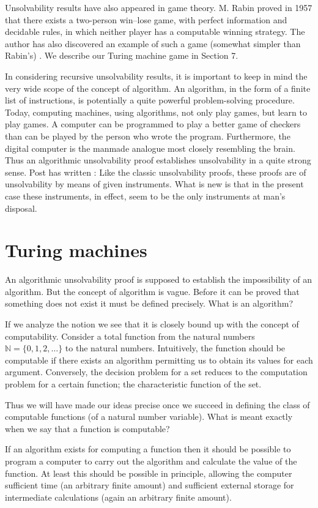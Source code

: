 \documentclass[11pt]{article}
\newcommand{\origpage}[1]{\marginnote{\footnotesize\textbf{[#1]}}}
\begin{document}
Unsolvability results have also appeared in game theory. M. Rabin proved in 1957 \cite{r30} that there exists a two-person win--lose game, with perfect information and decidable rules, in which neither player has a computable winning strategy. The author has also discovered an example of such a game (somewhat simpler than Rabin's) \cite{r17}. We describe our Turing machine game in Section 7.

In considering recursive unsolvability results, it is important to keep in mind the very wide scope of the concept of algorithm. An algorithm, in the form of a finite list of instructions, is potentially a quite powerful problem-solving procedure. Today, computing machines, using algorithms, not only play games, but learn to play games. A computer can be programmed to play a better game of checkers than can be played by the person who wrote the program. Furthermore, the digital computer is the manmade analogue most closely resembling the brain. Thus an algorithmic unsolvability proof establishes unsolvability in a quite strong sense. Post has written \cite{r28}: Like the classic unsolvability proofs, these proofs are of unsolvability by means of given instruments. What is new is that in the present case these instruments, in effect, seem to be the only instruments at man's disposal.
\section{Turing machines} An algorithmic unsolvability proof is supposed to establish the impossibility of an algorithm. But the concept of algorithm is vague. Before it can be proved that something does not exist it must be defined precisely. What is an algorithm?

If we analyze the notion we see that it is closely bound up with the concept of computability. Consider a total function from the natural numbers $\mathbb N=\{0,1,2,\ldots\}$ to the natural numbers. Intuitively, the function should be computable if there exists an algorithm permitting
\origpage{729}us to obtain its values for each argument. Conversely, the decision problem for a set reduces to the computation problem for a certain function; the characteristic function of the set.

Thus we will have made our ideas precise once we succeed in defining the class of computable functions (of a natural number variable). What is meant exactly when we say that a function is computable?

If an algorithm exists for computing a function then it should be possible to program a computer to carry out the algorithm and calculate the value of the function. At least this should be possible in principle, allowing the computer sufficient time (an arbitrary finite amount) and sufficient external storage for intermediate calculations (again an arbitrary finite amount).
\end{document}

